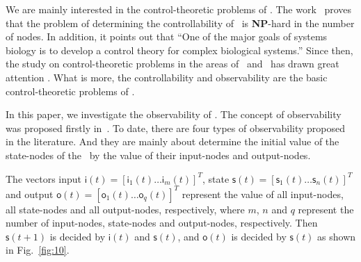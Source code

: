 We are mainly interested in the control-theoretic problems of \BCNs. The work~\cite{Akutsu2007Control} proves that the problem of determining the controllability of \BCNs\ is {\bf NP}-hard in the number of nodes. In addition, it points out that ``One of the major goals of systems biology is to develop a control theory for complex biological systems.'' Since then, the study on control-theoretic problems in the areas of \BNs\ and \BCNs\ has drawn great attention \cite{cheng2009controllability, Zhao2010Input, Cheng2011Identification, Cheng2011Analysis,Fornasini2013Observability}. What is more, the controllability and observability are the basic control-theoretic problems of \BCNs. %

In this paper, we investigate the observability of \BCNs. The concept of observability was proposed firstly in~\cite{cheng2009controllability}. To date, there are four types of observability proposed in the literature. And they are mainly about determine the initial value of the state-nodes of the \BCNs\ by the value of their input-nodes and output-nodes. 

The vectors input $\mathsf{i}(t)=[\mathsf{i}_1(t)\ldots\mathsf{i}_m(t)]^T$, state $\mathsf{s}(t)=[\mathsf{s}_1(t) \ldots \mathsf{s}_n(t)]^T$ and output $\mathsf{o}(t)=[\mathsf{o}_1(t) \ldots \mathsf{o}_q(t)]^T$ represent the value of all input-nodes, all state-nodes and all output-nodes, respectively, where $m$, $n$ and $q$ represent the number of input-nodes, state-nodes and output-nodes, respectively. 
 Then $\mathsf{s}(t+1)$ is decided by $\mathsf{i}(t)$ and $\mathsf{s}(t)$, and $\mathsf{o}(t)$ is decided by $\mathsf{s}(t)$ as shown in Fig.~\ref{fig:10}.


